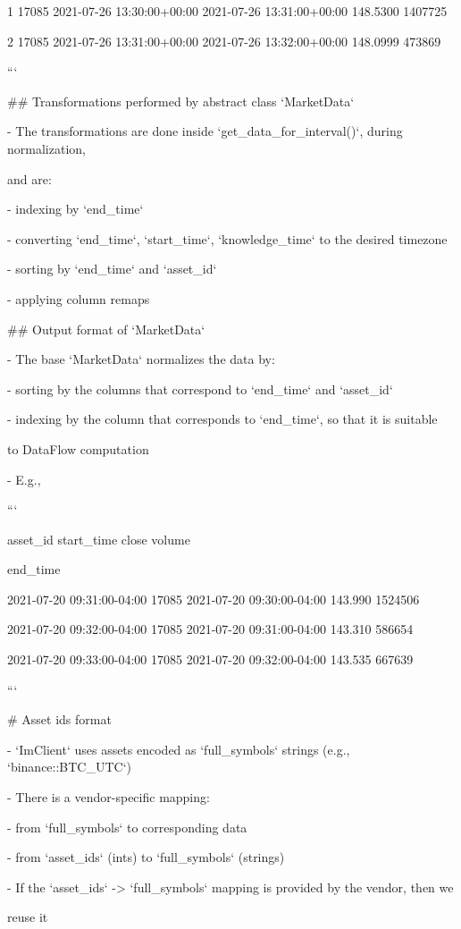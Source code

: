 \documentclass[11pt, reqno]{amsart}
\begin{document}
1 17085 2021-07-26 13:30:00+00:00 2021-07-26 13:31:00+00:00 148.5300
1407725

2 17085 2021-07-26 13:31:00+00:00 2021-07-26 13:32:00+00:00 148.0999
473869

```

\#\# Transformations performed by abstract class `MarketData`

- The transformations are done inside `get\_data\_for\_interval()`,
during normalization,

and are:

- indexing by `end\_time`

- converting `end\_time`, `start\_time`, `knowledge\_time` to the
desired timezone

- sorting by `end\_time` and `asset\_id`

- applying column remaps

\#\# Output format of `MarketData`

- The base `MarketData` normalizes the data by:

- sorting by the columns that correspond to `end\_time` and `asset\_id`

- indexing by the column that corresponds to `end\_time`, so that it is
suitable

to DataFlow computation

- E.g.,

```

asset\_id start\_time close volume

end\_time

2021-07-20 09:31:00-04:00 17085 2021-07-20 09:30:00-04:00 143.990
1524506

2021-07-20 09:32:00-04:00 17085 2021-07-20 09:31:00-04:00 143.310 586654

2021-07-20 09:33:00-04:00 17085 2021-07-20 09:32:00-04:00 143.535 667639

```

\# Asset ids format

- `ImClient` uses assets encoded as `full\_symbols` strings (e.g.,
`binance::BTC\_UTC`)

- There is a vendor-specific mapping:

- from `full\_symbols` to corresponding data

- from `asset\_ids` (ints) to `full\_symbols` (strings)

- If the `asset\_ids` -\textgreater{} `full\_symbols` mapping is
provided by the vendor, then we

reuse it
\end{document}
